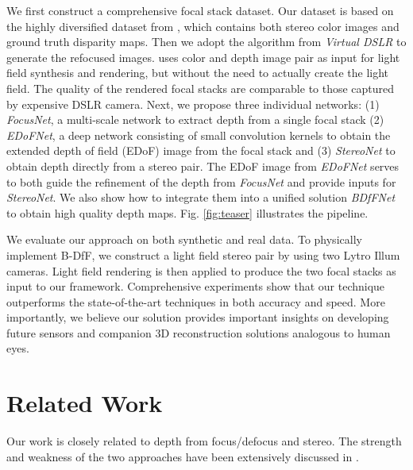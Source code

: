 \documentclass[10pt,twocolumn,letterpaper]{article}
\begin{document}
We first construct a comprehensive focal stack dataset. Our dataset is based on the highly diversified dataset from \cite{mayer16}, which contains both stereo color images and ground truth disparity maps. Then we adopt the algorithm from \emph{Virtual DSLR} \cite{yang16} to generate the refocused images. \cite{yang16} uses color and depth image pair as input for light field synthesis and rendering, but without the need to actually create the light field. The quality of the rendered focal stacks are comparable to those captured by expensive DSLR camera. Next, we propose three individual networks: (1) \emph{FocusNet}, a multi-scale network to extract depth from a single focal stack (2) \emph{EDoFNet}, a deep network consisting of small convolution kernels to obtain the extended depth of field (EDoF) image from the focal stack and (3) \emph{StereoNet} to obtain depth directly from a stereo pair. The EDoF image from \emph{EDoFNet} serves to both guide the refinement of the depth from \emph{FocusNet} and provide inputs for \emph{StereoNet}. We also show how to integrate them into a unified solution \emph{BDfFNet} to obtain high quality depth maps. Fig. \ref{fig:teaser} illustrates the pipeline.


We evaluate our approach on both synthetic and real data. To physically implement B-DfF, we construct a light field stereo pair by using two Lytro Illum cameras. Light field rendering is then applied to produce the two focal stacks as input to our framework. Comprehensive experiments show that our technique outperforms the state-of-the-art techniques in both accuracy and speed. More importantly, we believe our solution provides important insights on developing future sensors and companion 3D reconstruction solutions analogous to human eyes.


\section{Related Work}
Our work is closely related to depth from focus/defocus and stereo. The strength and weakness of the two approaches have been extensively discussed in \cite{schechner00, vaish06}.
\end{document}
